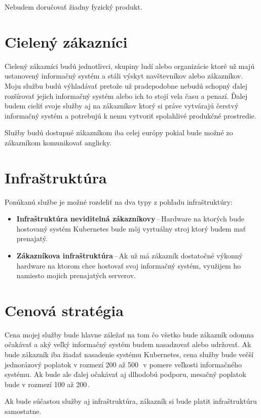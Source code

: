 Nebudem doručovať žiadny fyzický produkt.

\section{Cielený zákazníci}

Cielený zákazníci budú jednotlivci, skupiny ludí alebo organizácie ktoré už majú ustanovený informačný systém a stáli výskyt navštevníkov alebo zákazníkov. Moju službu budú výhladávať pretože už pradepodobne nebudú schopný ďalej rozšírovať jejich informačný systém alebo ich to stojí vela času a penazí. Ďalej budem cieliť svoje služby aj na zákazníkov ktorý si práve vytvárajú čerstvý informačný systém a potrebujú k nemu vytvoriť spolahlivé produkčné prostredie.

Služby budú dostupné zákazníkom iba celej európy pokial bude možné zo zákazníkom komunikovať anglicky.

\section{Infraštruktúra}

Ponúkanú službe je možné rozdeliť na dva typy z pohľadu infraštruktúry:
\begin{itemize}
  \item \textbf{Infraštruktúra neviditelná zákazníkovy}\,--\,Hardware na ktorých bude hostovaný systém Kubernetes bude môj vyrtuálny stroj ktorý budem mať prenajatý.
  \item \textbf{Zákazníkova infraštruktúra}\,--\,Ak už má zákazník dostatočné výkonný hardware na ktorom chce hostovať svoj informačný systém, využijem ho namiesto mojich prenajatých serverov.
\end{itemize}

\section{Cenová stratégia}

Cena mojej služby bude hlavne záležať na tom čo všetko bude zákazník odomna očakávať a aký veľký informačný systém budem nasadzovať alebo udržovať. Ak bude zákazník iba žiadať nasadenie systému Kubernetes, cena služby bude večší jednorázový poplatok v rozmezí 200 až 500\,\texteuro\ v pomere veľkosti informačného systému. Ak bude ale ďalej očakávať aj dlhodobú podporu, mesačný poplatok bude v rozmezí 100 až 200\,\texteuro.

Ak bude súčastou služby aj infraštruktúra, zákazník si bude platit infraštruktúru samostatne.


